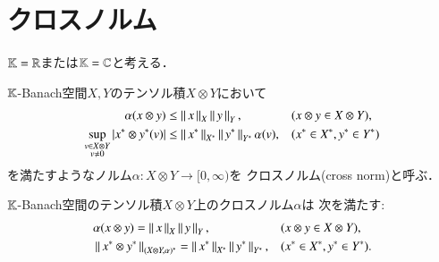 \section{クロスノルム}
	$\mathbb{K} = \mathbb{R}$または$\mathbb{K}=\mathbb{C}$と考える．
	\begin{screen}
		\begin{dfn}[クロスノルム]
			$\mathbb{K}$-Banach空間$X,Y$のテンソル積$X \otimes Y$において
			\begin{align}
				\alpha(x \otimes y) &\leq \left\|\, x\, \right\|_{X} \left\|\, y\, \right\|_{Y}, && (x \otimes y \in X \otimes Y), \label{eq:cross_norm_def_1}\\
				\operatorname*{sup}_{\substack{v \in X \otimes Y \\ v \neq 0}} \left| x^* \otimes y^* (v) \right| &\leq \left\|\, x^*\, \right\|_{X^*} \left\|\, y^*\, \right\|_{Y^*}\alpha(v),
				&& (x^* \in X^*, y^* \in Y^*)
			\end{align}
			を満たすようなノルム$\alpha:X \otimes Y \longrightarrow [0,\infty)$を
			クロスノルム(cross norm)と呼ぶ．
		\end{dfn}
	\end{screen}
	
	\begin{screen}
		\begin{thm}
			$\mathbb{K}$-Banach空間のテンソル積$X \otimes Y$上のクロスノルム$\alpha$は
			次を満たす:
			\begin{align}
				&\alpha(x \otimes y) = \left\|\, x\, \right\|_{X} \left\|\, y\, \right\|_{Y}, && (x \otimes y \in X \otimes Y), \\
				&\left\|\, x^* \otimes y^*\, \right\|_{(X \otimes Y, \alpha)^*} = \left\|\, x^*\, \right\|_{X^*} \left\|\, y^*\, \right\|_{Y^*},
				&& (x^* \in X^*, y^* \in Y^*).
			\end{align}
		\end{thm}
	\end{screen}
	
